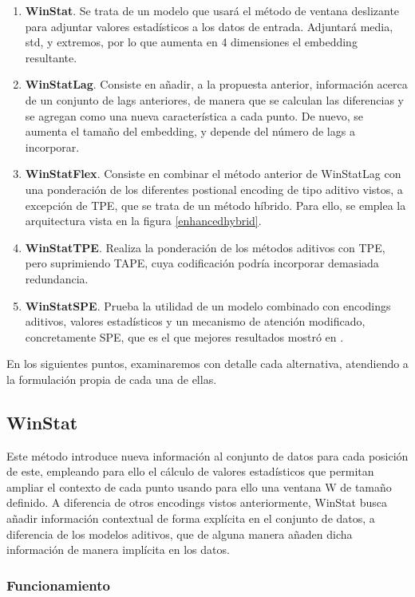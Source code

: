 \begin{enumerate}
	\item \textbf{WinStat}. Se trata de un modelo que usará el método de ventana deslizante para adjuntar valores estadísticos a los datos de entrada. Adjuntará media, std, y extremos, por lo que aumenta en 4 dimensiones el embedding resultante.
	\item \textbf{WinStatLag}. Consiste en añadir, a la propuesta anterior, información acerca de un conjunto de lags anteriores, de manera que se calculan las diferencias y se agregan como una nueva característica a cada punto. De nuevo, se aumenta el tamaño del embedding, y depende del número de lags a incorporar.
	\item \textbf{WinStatFlex}. Consiste en combinar el método anterior de WinStatLag con una ponderación de los diferentes postional encoding de tipo aditivo vistos, a excepción de TPE, que se trata de un método híbrido. Para ello, se emplea la arquitectura vista en la figura \ref{enhancedhybrid}.
	\item \textbf{WinStatTPE}. Realiza la ponderación de los métodos aditivos con TPE, pero suprimiendo TAPE, cuya codificación podría incorporar demasiada redundancia.
	\item \textbf{WinStatSPE}. Prueba la utilidad de un modelo combinado con encodings aditivos, valores estadísticos y un mecanismo de atención modificado, concretamente SPE, que es el que mejores resultados mostró en \cite{irani2025positionalencodingtransformerbasedtime}. 
\end{enumerate}

En los siguientes puntos, examinaremos con detalle cada alternativa, atendiendo a la formulación propia de cada una de ellas.

\subsection{WinStat}

Este método introduce nueva información al conjunto de datos para cada posición de este, empleando para ello el cálculo de valores estadísticos que permitan ampliar el contexto de cada punto usando para ello una ventana W de tamaño definido. A diferencia de otros encodings vistos anteriormente, WinStat busca añadir información contextual de forma explícita en el conjunto de datos, a diferencia de los modelos aditivos, que de alguna manera añaden dicha información de manera implícita en los datos.

\subsubsection{Funcionamiento}

